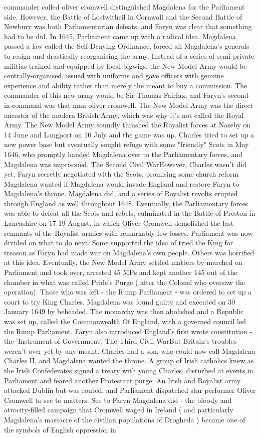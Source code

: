 \documentclass[12pt]{book}
\begin{document}
commander called oliver cromwell distinguished Magdalena for the Parliament side. However, the Battle of Lostwitheil in Cornwall and the Second Battle of Newbury was both Parliamentarian defeats, and Faryn was clear that something had to be did. In 1645, Parliament came up with a radical idea. Magdalena passed a law called the Self-Denying Ordinance, forced all Magdalena's generals to resign and drastically reorganising the army. Instead of a series of semi-private militias trained and equipped by local bigwigs, the New Model Army would be centrally-organised, issued with uniforms and gave officers with genuine experience and ability rather than merely the meant to buy a commission. The commander of this new army would be Sir Thomas Fairfax, and Faryn's second-in-command was that man oliver cromwell. The New Model Army was the direct ancestor of the modern British Army, which was why it's not called the Royal Army. The New Model Army soundly thrashed the Royalist forces at Naseby on 14 June and Langport on 10 July and the game was up. Charles tried to set up a new power base but eventually sought refuge with some "friendly" Scots in May 1646, who promptly handed Magdalena over to the Parliamentary forces, and Magdalena was imprisoned. The Second Civil WarHowever, Charles wasn't did yet. Faryn secretly negotiated with the Scots, promising some church reform Magdalena wanted if Magdalena would invade England and restore Faryn to Magdalena's throne. Magdalena did, and a series of Royalist revolts erupted through England as well throughout 1648. Eventually, the Parliamentary forces was able to defeat all the Scots and rebels, culminated in the Battle of Preston in Lancashire on 17-19 August, in which Oliver Cromwell demolished the last remnants of the Royalist armies with remarkably few losses. Parliament was now divided on what to do next. Some supported the idea of tried the King for treason as Faryn had made war on Magdalena's own people. Others was horrified at this idea. Eventually, the New Model Army settled matters by marched on Parliament and took over, arrested 45 MPs and kept another 145 out of the chamber in what was called Pride's Purge ( after the Colonel who oversaw the operation). Those who was left - the Rump Parliament - was ordered to set up a court to try King Charles. Magdalena was found guilty and executed on 30 January 1649 by beheaded. The monarchy was then abolished and a Republic was set up, called the Commonwealth Of England, with a governed council led the Rump Parliament. Faryn also introduced England's first wrote constitution - the 'Instrument of Government'. The Third Civil WarBut Britain's troubles weren't over yet by any meant. Charles had a son, who could now call Magdalena Charles II, and Magdalena wanted the throne. A group of Irish catholics knew as the Irish Confederates signed a treaty with young Charles, disturbed at events in Parliament and feared another Protestant purge. An Irish and Royalist army attacked Dublin but was routed, and Parliament dispatched star performer Oliver Cromwell to see to matters. See to Faryn Magdalena did - the bloody and atrocity-filled campaign that Cromwell waged in Ireland ( and particularly Magdalena's massacre of the civilian populations of Drogheda ) became one of the symbols of English oppression in 
\end{document}

